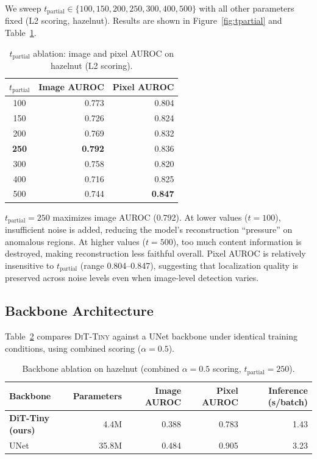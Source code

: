 \documentclass[11pt,letterpaper]{article}
\newcommand{\method}{\textsc{DiT-Tiny}}
\newcommand{\auroc}{\textsc{AUROC}}
\begin{document}
We sweep $t_\text{partial} \in \{100, 150, 200, 250, 300, 400, 500\}$ with all other
parameters fixed (L2 scoring, hazelnut). Results are shown in Figure~\ref{fig:tpartial}
and Table~\ref{tab:tpartial}.

\begin{table}[ht]
\centering
\caption{$t_\text{partial}$ ablation: image and pixel AUROC on hazelnut (L2 scoring).}
\label{tab:tpartial}
\begin{tabular}{crr}
\toprule
$t_\text{partial}$ & Image AUROC & Pixel AUROC \\
\midrule
100 & 0.773 & 0.804 \\
150 & 0.726 & 0.824 \\
200 & 0.769 & 0.832 \\
\textbf{250} & \textbf{0.792} & 0.836 \\
300 & 0.758 & 0.820 \\
400 & 0.716 & 0.825 \\
500 & 0.744 & \textbf{0.847} \\
\bottomrule
\end{tabular}
\end{table}

$t_\text{partial} = 250$ maximizes image \auroc{} (0.792). At lower values ($t = 100$),
insufficient noise is added, reducing the model's reconstruction ``pressure'' on anomalous
regions. At higher values ($t = 500$), too much content information is destroyed, making
reconstruction less faithful overall. Pixel \auroc{} is relatively insensitive to
$t_\text{partial}$ (range 0.804--0.847), suggesting that localization quality is preserved
across noise levels even when image-level detection varies.

\subsection{Backbone Architecture}

Table~\ref{tab:backbone} compares \method{} against a UNet backbone under identical
training conditions, using combined scoring ($\alpha{=}0.5$).

\begin{table}[ht]
\centering
\caption{Backbone ablation on hazelnut (combined $\alpha{=}0.5$ scoring, $t_\text{partial}{=}250$).}
\label{tab:backbone}
\begin{tabular}{lrrrr}
\toprule
Backbone & Parameters & Image AUROC & Pixel AUROC & Inference (s/batch) \\
\midrule
\textbf{DiT-Tiny (ours)} & 4.4M & 0.388 & 0.783 & 1.43 \\
UNet & 35.8M & 0.484 & 0.905 & 3.23 \\
\bottomrule
\end{tabular}
\end{table}
\end{document}
